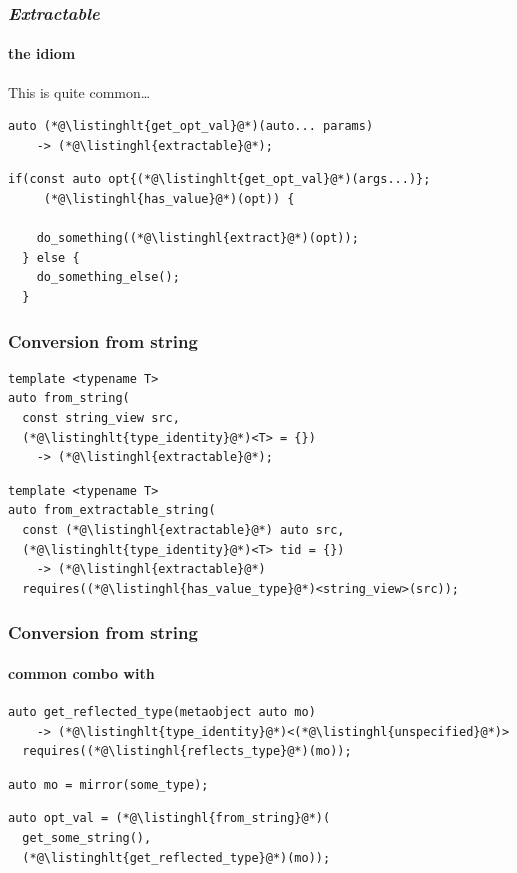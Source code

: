 \documentclass[compress,table,xcolor=table]{beamer}
\begin{document}
\begin{frame}[fragile]
  \frametitle{\em Extractable}
  \framesubtitle{the idiom}
  This is quite common\ldots
  \begin{lstlisting}[language=c++2x,basicstyle=\normalsize\ttfamily]
  auto (*@\listinghlt{get_opt_val}@*)(auto... params)
    -> (*@\listinghl{extractable}@*);
  \end{lstlisting}
  \vfill
  \begin{lstlisting}[language=c++2x,basicstyle=\normalsize\ttfamily]
  if(const auto opt{(*@\listinghlt{get_opt_val}@*)(args...)};
     (*@\listinghl{has_value}@*)(opt)) {

    do_something((*@\listinghl{extract}@*)(opt));
  } else {
    do_something_else();
  }
  \end{lstlisting}
\end{frame}
\begin{frame}[fragile]
  \frametitle{Conversion from string}
  \begin{lstlisting}[language=c++2x,basicstyle=\normalsize\ttfamily]
template <typename T>
auto from_string(
  const string_view src,
  (*@\listinghlt{type_identity}@*)<T> = {})
    -> (*@\listinghl{extractable}@*);
  \end{lstlisting}
  \vfill
  \begin{lstlisting}[language=c++2x,basicstyle=\normalsize\ttfamily]
template <typename T>
auto from_extractable_string(
  const (*@\listinghl{extractable}@*) auto src,
  (*@\listinghlt{type_identity}@*)<T> tid = {})
    -> (*@\listinghl{extractable}@*)
  requires((*@\listinghl{has_value_type}@*)<string_view>(src));
  \end{lstlisting}
\end{frame}
\begin{frame}[fragile]
  \frametitle{Conversion from string}
  \framesubtitle{common combo with }
  \begin{lstlisting}[language=c++2x,basicstyle=\normalsize\ttfamily]
auto get_reflected_type(metaobject auto mo)
    -> (*@\listinghlt{type_identity}@*)<(*@\listinghl{unspecified}@*)>
  requires((*@\listinghl{reflects_type}@*)(mo));
  \end{lstlisting}
  \vfill
  \begin{lstlisting}[language=c++2x,basicstyle=\normalsize\ttfamily]
auto mo = mirror(some_type);
  \end{lstlisting}
  \begin{lstlisting}[language=c++2x,basicstyle=\normalsize\ttfamily]
auto opt_val = (*@\listinghl{from_string}@*)(
  get_some_string(),
  (*@\listinghlt{get_reflected_type}@*)(mo));
  \end{lstlisting}
\end{frame}
\end{document}
